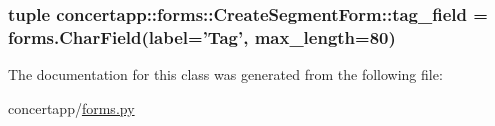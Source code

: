 \hypertarget{classconcertapp_1_1forms_1_1_create_segment_form_a3253354235460c739c5128a37a72c4bb}{
\subsubsection[{tag\_\-field}]{\setlength{\rightskip}{0pt plus 5cm}tuple {\bf concertapp::forms::CreateSegmentForm::tag\_\-field} = forms.CharField(label='Tag', max\_\-length=80)}}
\label{classconcertapp_1_1forms_1_1_create_segment_form_a3253354235460c739c5128a37a72c4bb}


The documentation for this class was generated from the following file:\begin{DoxyCompactItemize}
\item 
concertapp/\hyperlink{forms_8py}{forms.py}\end{DoxyCompactItemize}

